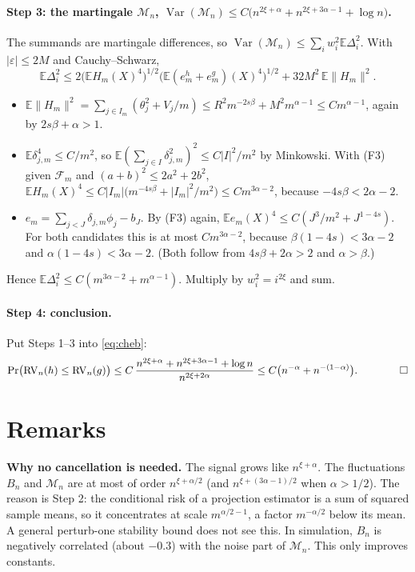 \documentclass[11pt]{article}
\newcommand{\E}{\mathbb{E}}
\newcommand{\Var}{\operatorname{Var}}
\newcommand{\RV}{\mathrm{RV}}
\begin{document}
\paragraph{Step 3: the martingale $\mathcal M_n$, $\Var(\mathcal M_n)\le C\bigl(n^{2\xi+\alpha}+n^{2\xi+3\alpha-1}+\log n\bigr)$.} The summands are martingale differences, so $\Var(\mathcal M_n)\le\sum_iw_i^2\E\Delta_i^2$. With $|\varepsilon|\le2M$ and Cauchy--Schwarz,
\[
\E\Delta_i^2\le2\bigl(\E H_m(X)^4\bigr)^{1/2}\bigl(\E(e^h_m+e^g_m)(X)^4\bigr)^{1/2}+32M^2\,\E\|H_m\|^2 .
\]
\begin{itemize}\itemsep1pt
\item $\E\|H_m\|^2=\sum_{j\in I_m}(\theta_j^2+V_j/m)\le R^2m^{-2s\beta}+M^2m^{\alpha-1}\le Cm^{\alpha-1}$, again by $2s\beta+\alpha>1$.
\item $\E\delta_{j,m}^4\le C/m^2$, so $\E(\sum_{j\in I}\delta_{j,m}^2)^2\le C|I|^2/m^2$ by Minkowski. With (F3) given $\mathcal F_m$ and $(a+b)^2\le2a^2+2b^2$,
$\E H_m(X)^4\le C|I_m|\bigl(m^{-4s\beta}+|I_m|^2/m^2\bigr)\le Cm^{3\alpha-2}$, because $-4s\beta<2\alpha-2$.
\item $e_m=\sum_{j<J}\delta_{j,m}\phi_j-b_J$. By (F3) again, $\E e_m(X)^4\le C(J^3/m^2+J^{1-4s})$. For both candidates this is at most $Cm^{3\alpha-2}$, because $\beta(1-4s)<3\alpha-2$ and $\alpha(1-4s)<3\alpha-2$. (Both follow from $4s\beta+2\alpha>2$ and $\alpha>\beta$.)
\end{itemize}
Hence $\E\Delta_i^2\le C(m^{3\alpha-2}+m^{\alpha-1})$. Multiply by $w_i^2=i^{2\xi}$ and sum.

\paragraph{Step 4: conclusion.} Put Steps 1--3 into \eqref{eq:cheb}:
\[
\Pr\bigl(\RV_n(h)\le\RV_n(g)\bigr)\le C\,\frac{n^{2\xi+\alpha}+n^{2\xi+3\alpha-1}+\log n}{n^{2\xi+2\alpha}}\le C\bigl(n^{-\alpha}+n^{-(1-\alpha)}\bigr).\qquad\qed
\]

\section{Remarks}

\textbf{Why no cancellation is needed.} The signal grows like $n^{\xi+\alpha}$. The fluctuations $B_n$ and $\mathcal M_n$ are at most of order $n^{\xi+\alpha/2}$ (and $n^{\xi+(3\alpha-1)/2}$ when $\alpha>1/2$). The reason is Step 2: the conditional risk of a projection estimator is a sum of squared sample means, so it concentrates at scale $m^{\alpha/2-1}$, a factor $m^{-\alpha/2}$ below its mean. A general perturb-one stability bound does not see this. In simulation, $B_n$ is negatively correlated (about $-0.3$) with the noise part of $\mathcal M_n$. This only improves constants.
\end{document}
